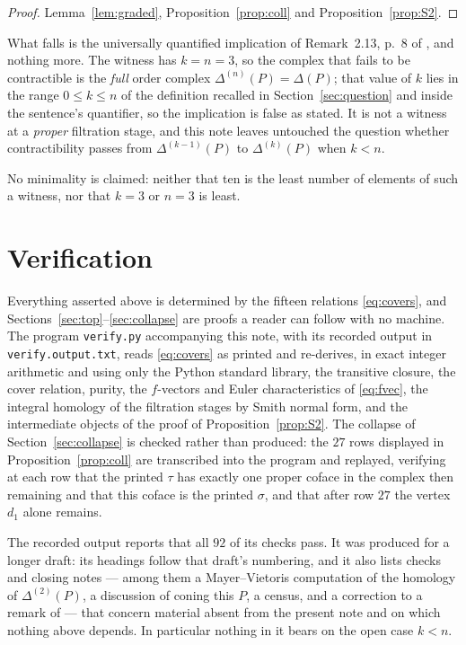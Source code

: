 \documentclass[11pt]{amsart}
\newcommand{\Dl}{\Delta}
\begin{document}
\begin{proof}
Lemma~\ref{lem:graded}, Proposition~\ref{prop:coll} and
Proposition~\ref{prop:S2}.
\end{proof}

What falls is the universally quantified implication of Remark~2.13, p.~8 of
\cite{Kitajima}, and nothing more. The witness has $k=n=3$, so the complex that
fails to be contractible is the \emph{full} order complex
$\Dl^{(n)}(P)=\Dl(P)$; that value of $k$ lies in the range $0\le k\le n$ of the
definition recalled in Section~\ref{sec:question} and inside the sentence's
quantifier, so the implication is false as stated. It is not a witness at a
\emph{proper} filtration stage, and this note leaves untouched the question
whether contractibility passes from $\Dl^{(k-1)}(P)$ to $\Dl^{(k)}(P)$ when
$k<n$.

No minimality is claimed: neither that ten is the least number of elements of
such a witness, nor that $k=3$ or $n=3$ is least.

\section{Verification}\label{sec:verify}

Everything asserted above is determined by the fifteen relations
\eqref{eq:covers}, and Sections~\ref{sec:top}--\ref{sec:collapse} are proofs a
reader can follow with no machine. The program \texttt{verify.\allowbreak py}
accompanying this note, with its recorded output in
\texttt{verify.\allowbreak output.\allowbreak txt}, reads
\eqref{eq:covers} as printed and re-derives, in exact integer arithmetic and
using only the Python standard library, the transitive closure, the cover
relation, purity, the $f$-vectors and Euler characteristics of
\eqref{eq:fvec}, the integral homology of the filtration stages by Smith
normal form, and the intermediate objects of the proof of
Proposition~\ref{prop:S2}. The collapse of Section~\ref{sec:collapse} is
checked rather than produced: the $27$ rows displayed in
Proposition~\ref{prop:coll} are transcribed into the program and replayed,
verifying at each row that the printed $\tau$ has exactly one proper coface in
the complex then remaining and that this coface is the printed $\sigma$, and
that after row $27$ the vertex $d_1$ alone remains.

The recorded output reports that all $92$ of its checks pass. It was produced
for a longer draft: its headings follow that draft's numbering, and it also
lists checks and closing notes --- among them a Mayer--Vietoris computation of
the homology of $\Dl^{(2)}(P)$, a discussion of coning this $P$, a census, and
a correction to a remark of \cite{Kitajima} --- that concern material absent
from the present note and on which nothing above depends. In particular
nothing in it bears on the open case $k<n$.
\end{document}
